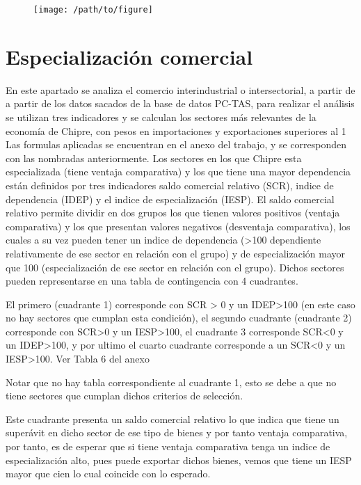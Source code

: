 \documentclass[a4paper,openright,12pt]{book}
\begin{document}
\begin{figure}
    \texttt{[image: /path/to/figure]}
    \caption{}
    \label{}
    \caption*{}
\end{figure}

\chapter{Especialización comercial}
\label{cap6}

En este apartado se analiza el comercio interindustrial o intersectorial, a partir de a partir de los datos sacados de la base de datos PC-TAS, para realizar el análisis se utilizan tres indicadores y se calculan los sectores más relevantes de la economía de Chipre, con pesos en importaciones y exportaciones superiores al 1%
Las formulas aplicadas se encuentran en el anexo del trabajo, y se corresponden con las nombradas anteriormente.
Los sectores en los que Chipre esta especializada (tiene ventaja comparativa) y los que tiene una mayor dependencia están definidos por tres indicadores saldo comercial relativo (SCR), indice de dependencia (IDEP) y el indice de especialización (IESP). El saldo comercial relativo permite dividir en dos grupos los que tienen valores positivos (ventaja comparativa) y los que presentan valores negativos (desventaja comparativa), los cuales a su vez pueden tener un indice de dependencia (>100 dependiente relativamente de ese sector en relación con el grupo) y de especialización mayor que 100 (especialización de ese sector en relación con el grupo). Dichos sectores pueden representarse en una tabla de contingencia con 4 cuadrantes.

El primero (cuadrante 1) corresponde con SCR > 0 y un IDEP>100 (en este caso no hay sectores que cumplan esta condición), el segundo cuadrante (cuadrante 2) corresponde con SCR>0 y un IESP>100, el cuadrante 3 corresponde SCR<0 y un IDEP>100, y por ultimo el cuarto cuadrante corresponde a un SCR<0 y un IESP>100.
Ver Tabla 6 del anexo

Notar que no hay tabla correspondiente al cuadrante 1, esto se debe a que no tiene sectores que cumplan dichos criterios de selección.



Este cuadrante presenta un saldo comercial relativo lo que indica que tiene un superávit en dicho sector de ese tipo de bienes y por tanto ventaja comparativa, por tanto, es de esperar que si tiene ventaja comparativa tenga un indice de especialización alto, pues puede exportar dichos bienes, vemos que tiene un IESP mayor que cien lo cual coincide con lo esperado.
\end{document}
